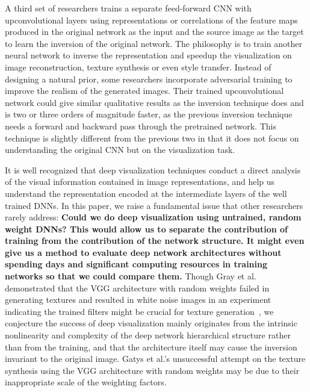 \documentclass{article}
\begin{document}
A third set of researchers  trains a separate feed-forward CNN with upconvolutional layers using representations or correlations of the feature maps produced in the original network as the input and the source image as the target to learn the inversion of the original network. The philosophy is to train another neural network to inverse the representation and speedup the visualization on image reconstruction\cite{Dosovitskiy2015inverting, Dosovitskiy2016generating}, texture synthesis\cite{Ulyanov2016texture} or even style transfer\cite{Johnson2016perceptual}.
Instead of designing a natural prior, some researchers incorporate adversarial training\cite{Goodfellow2014NIPS} to improve the realism of the generated images\cite{Dosovitskiy2016generating}.
Their trained upconvolutional network could give similar qualitative results as the inversion technique does and is two or three orders of magnitude faster, as the previous inversion technique needs a forward and backward pass through the pretrained network.
This technique is slightly different from the previous two in that it does not focus on understanding the original CNN but on the visualization task.

It is well recognized that deep visualization techniques conduct a direct analysis of the visual information contained in image representations, and help us understand the representation encoded at the intermediate layers of the well trained DNNs.
In this paper, we raise a fundamental issue that other researchers rarely address:  \textbf{Could we do deep visualization using untrained, random weight DNNs? This would allow us to separate the contribution of training from the contribution of the network structure.
It might even give us a method to evaluate deep network architectures without spending days and significant computing resources in training networks so that we could compare them.}
Though Gray et al. demonstrated that the VGG architecture with random weights failed in generating textures and resulted in white noise images in an experiment indicating the trained filters might be crucial for texture generation~\cite{Gatys2015texture},
we conjecture the success of deep visualization mainly originates from the intrinsic nonlinearity and complexity of the deep network hierarchical structure rather than from the training, and that the architecture itself may cause the inversion invariant to the original image.
Gatys et al.'s unsuccessful attempt on the texture synthesis using the VGG architecture with random weights may be due to their inappropriate scale of the weighting factors.
\end{document}
